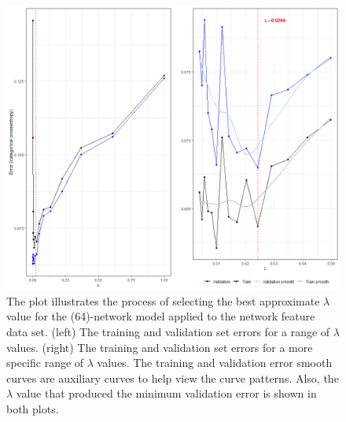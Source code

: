 \begin{figure}
	\begin{center}
		\includegraphics[scale = 0.5]{fig/CH3/network_mod_2_lambda_plot.png}
		\caption{The plot illustrates the process of selecting the best approximate $\lambda$ value for the (64)-network model applied to the network feature data set. (left) The training and validation set errors for a range of $\lambda$ values. (right) The training and validation set errors for a more specific range of $\lambda$ values. The training and validation error smooth curves are auxiliary curves to help view the curve patterns. Also, the $\lambda$ value that produced the minimum validation error is shown in both plots.}
		\label{fig:ch3_nn_validation_mod2_network}
	\end{center}	
\end{figure}

